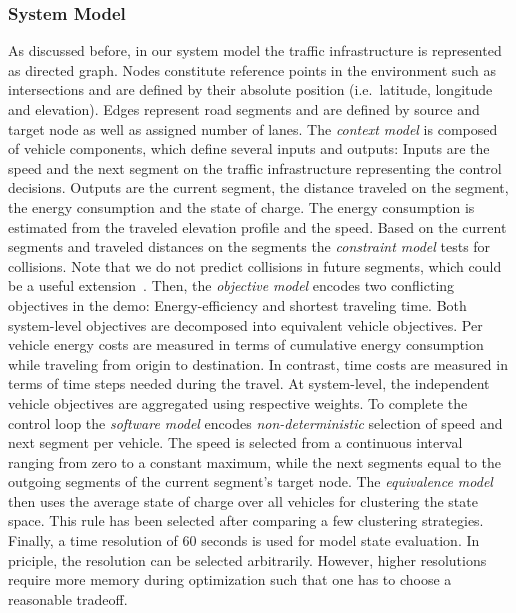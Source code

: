 \documentclass[conference]{../cls/IEEEtran}
\begin{document}
\subsubsection*{System Model}

As discussed before, in our system model the traffic infrastructure is
represented as directed graph. Nodes constitute reference points in the
environment such as intersections and are defined by their absolute position
(i.e.\ latitude, longitude and elevation). Edges represent road segments and are
defined by source and target node as well as assigned number of lanes. The
\textit{context model} is composed of vehicle components, which define several
inputs and outputs: Inputs are the speed and the next segment on the traffic
infrastructure representing the control decisions. Outputs are the current
segment, the distance traveled on the segment, the energy consumption and the
state of charge. The energy consumption is estimated from the traveled elevation
profile and the speed. Based on the current segments and traveled distances on
the segments the \textit{constraint model} tests for collisions.
Note that we do not predict collisions in future
segments, which could be a useful extension~\cite{Shi2012}.
Then, the \textit{objective model} encodes two conflicting objectives in the demo: Energy-efficiency and shortest traveling time. Both system-level
objectives are decomposed into equivalent vehicle objectives. Per vehicle energy costs are measured in terms of
cumulative energy consumption while traveling from origin to destination. In
contrast, time costs are measured in terms of time steps needed during the
travel. At system-level, the independent vehicle objectives are aggregated using
respective weights. To complete the control loop the \textit{software model}
encodes \textit{non-deterministic} selection of speed and next segment per
vehicle. The speed is selected from a continuous interval ranging from zero to a
constant maximum, while the next segments equal to the outgoing segments of the
current segment's target node. The \textit{equivalence model} then uses the
average state of charge over all vehicles for clustering the state space. This
rule has been selected after comparing a few clustering strategies. Finally, a
time resolution of 60 seconds is used for model state evaluation. In priciple,
the resolution can be selected arbitrarily. However, higher resolutions require
more memory during optimization such that one has to choose a reasonable
tradeoff.
\end{document}
